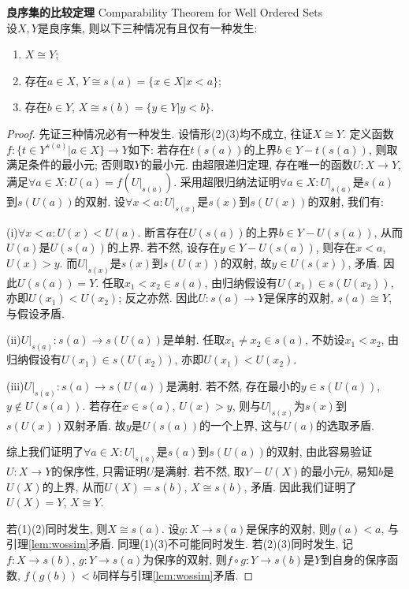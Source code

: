 \begin{pro}\textbf{良序集的比较定理} Comparability Theorem for Well Ordered Sets\\
设$X,Y$是良序集, 则以下三种情况有且仅有一种发生: 
\begin{enumerate}
    \item $X \cong Y$;
    \item 存在$a\in X$, $Y\cong s(a)=\{x\in X\vert x<a\}$;
    \item 存在$b\in Y$, $X\cong s(b)=\{y\in Y\vert y<b\}$.
\end{enumerate}
\label{thm:woscomp}
\end{pro}
\begin{proof}
先证三种情况必有一种发生. 设情形(2)(3)均不成立, 往证$X\cong Y$. 定义函数$f:\{t\in Y^{s(a)}\vert a\in X\}\to Y$如下: 若存在$t(s(a))$的上界$b\in Y-t(s(a))$, 则取满足条件的最小元; 否则取$Y$的最小元. 由超限递归定理, 存在唯一的函数$U: X\to Y$, 满足$\forall a\in X: U(a)=f(U|_{s(a)})$. 采用超限归纳法证明$\forall a\in X: U|_{s(a)}$是$s(a)$到$s(U(a))$的双射. 设$\forall x<a: U|_{s(x)}$是$s(x)$到$s(U(x))$的双射, 我们有: \par (i)$\forall x<a: U(x)<U(a)$. 断言存在$U(s(a))$的上界$b\in Y-U(s(a))$, 从而$U(a)$是$U(s(a))$的上界. 若不然, 设存在$y\in Y-U(s(a))$, 则存在$x<a$, $U(x)>y$. 而$U|_{s(x)}$是$s(x)$到$s(U(x))$的双射, 故$y\in U(s(x))$, 矛盾. 因此$U(s(a))=Y$. 任取$x_1<x_2\in s(a)$, 由归纳假设有$U(x_1)\in s(U(x_2))$, 亦即$U(x_1)<U(x_2)$; 反之亦然. 因此$U: s(a)\to Y$是保序的双射, $s(a)\cong Y$, 与假设矛盾. 
\par (ii)$U|_{s(a)}: s(a)\to s(U(a))$是单射. 任取$x_1\neq x_2\in s(a)$, 不妨设$x_1<x_2$, 由归纳假设有$U(x_1)\in s(U(x_2))$, 亦即$U(x_1)<U(x_2)$. 
\par (iii)$U|_{s(a)}: s(a)\to s(U(a))$是满射. 若不然, 存在最小的$y\in s(U(a))$, $y\notin U(s(a))$. 若存在$x\in s(a)$, $U(x)>y$, 则与$U|_{s(x)}$为$s(x)$到$s(U(x))$双射矛盾. 故$y$是$U(s(a))$的一个上界, 这与$U(a)$的选取矛盾. 
\par 综上我们证明了$\forall a\in X: U|_{s(a)}$是$s(a)$到$s(U(a))$的双射, 由此容易验证$U:X\to Y$的保序性, 只需证明$U$是满射. 若不然, 取$Y-U(X)$的最小元$b$, 易知$b$是$U(X)$的上界, 从而$U(X)=s(b)$, $X\cong s(b)$, 矛盾. 因此我们证明了$U(X)=Y$, $X\cong Y$. 
\par 若(1)(2)同时发生, 则$X\cong s(a)$. 设$g: X\to s(a)$是保序的双射, 则$g(a)<a$, 与引理\ref{lem:wossim}矛盾. 同理(1)(3)不可能同时发生. 若(2)(3)同时发生, 记$f:X\to s(b)$, $g: Y\to s(a)$为保序的双射, 则$f\circ g: Y \to s(b)$是$Y$到自身的保序函数, $f(g(b))<b$同样与引理\ref{lem:wossim}矛盾.
\end{proof}

